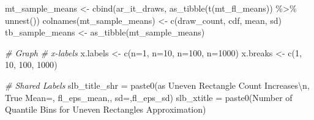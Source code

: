\documentclass[
]{book}
\newenvironment{Shaded}{\begin{snugshade}}{\end{snugshade}}
\newcommand{\CommentTok}[1]{\textcolor[rgb]{0.56,0.35,0.01}{\textit{#1}}}
\newcommand{\DecValTok}[1]{\textcolor[rgb]{0.00,0.00,0.81}{#1}}
\newcommand{\FunctionTok}[1]{\textcolor[rgb]{0.00,0.00,0.00}{#1}}
\newcommand{\NormalTok}[1]{#1}
\newcommand{\OtherTok}[1]{\textcolor[rgb]{0.56,0.35,0.01}{#1}}
\newcommand{\SpecialCharTok}[1]{\textcolor[rgb]{0.00,0.00,0.00}{#1}}
\newcommand{\StringTok}[1]{\textcolor[rgb]{0.31,0.60,0.02}{#1}}
\begin{document}
\begin{Shaded}
\begin{Highlighting}[]
\NormalTok{mt\_sample\_means }\OtherTok{\textless{}{-}} \FunctionTok{cbind}\NormalTok{(ar\_it\_draws, }\FunctionTok{as\_tibble}\NormalTok{(}\FunctionTok{t}\NormalTok{(mt\_fl\_means)) }\SpecialCharTok{\%\textgreater{}\%} \FunctionTok{unnest}\NormalTok{())}
\FunctionTok{colnames}\NormalTok{(mt\_sample\_means) }\OtherTok{\textless{}{-}} \FunctionTok{c}\NormalTok{(}\StringTok{\textquotesingle{}draw\_count\textquotesingle{}}\NormalTok{, }\StringTok{\textquotesingle{}cdf\textquotesingle{}}\NormalTok{, }\StringTok{\textquotesingle{}mean\textquotesingle{}}\NormalTok{, }\StringTok{\textquotesingle{}sd\textquotesingle{}}\NormalTok{)}
\NormalTok{tb\_sample\_means }\OtherTok{\textless{}{-}} \FunctionTok{as\_tibble}\NormalTok{(mt\_sample\_means)}

\CommentTok{\# Graph}
\CommentTok{\# x{-}labels}
\NormalTok{x.labels }\OtherTok{\textless{}{-}} \FunctionTok{c}\NormalTok{(}\StringTok{\textquotesingle{}n=1\textquotesingle{}}\NormalTok{, }\StringTok{\textquotesingle{}n=10\textquotesingle{}}\NormalTok{, }\StringTok{\textquotesingle{}n=100\textquotesingle{}}\NormalTok{, }\StringTok{\textquotesingle{}n=1000\textquotesingle{}}\NormalTok{)}
\NormalTok{x.breaks }\OtherTok{\textless{}{-}} \FunctionTok{c}\NormalTok{(}\DecValTok{1}\NormalTok{, }\DecValTok{10}\NormalTok{, }\DecValTok{100}\NormalTok{, }\DecValTok{1000}\NormalTok{)}

\CommentTok{\# Shared Labels}
\NormalTok{slb\_title\_shr }\OtherTok{=} \FunctionTok{paste0}\NormalTok{(}\StringTok{\textquotesingle{}as Uneven Rectangle Count Increases}\SpecialCharTok{\textbackslash{}n}\StringTok{\textquotesingle{}}\NormalTok{,}
                       \StringTok{\textquotesingle{}True Mean=\textquotesingle{}}\NormalTok{, fl\_eps\_mean,}\StringTok{\textquotesingle{}, sd=\textquotesingle{}}\NormalTok{,fl\_eps\_sd)}
\NormalTok{slb\_xtitle }\OtherTok{=} \FunctionTok{paste0}\NormalTok{(}\StringTok{\textquotesingle{}Number of Quantile Bins for Uneven Rectangles Approximation\textquotesingle{}}\NormalTok{)}


\end{Highlighting}
\end{Shaded}
\end{document}
